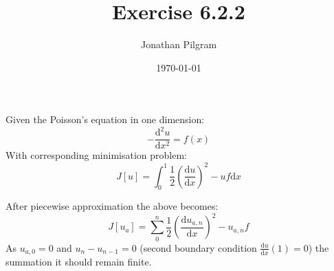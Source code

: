 \documentclass{article}
\title{Exercise 6.2.2}
\author{Jonathan Pilgram}
\date{\today}
\begin{document}
\maketitle

Given the Poisson's equation in one dimension: 
\[
	-\frac{\mathrm{d}^2u}{\mathrm{d}x^2} = f(x)
\] 
With corresponding minimisation problem: 
\[
	J[u] = \int_{0}^{1} \frac{1}{2} ( \frac{\mathrm{d}u}{\mathrm{d}x} )^2-uf \mathrm{d}x
\] 

After piecewise approximation the above becomes: 
\[
	J[u_a] = \sum_{0}^{n} \frac{1}{2} ( \frac{\mathrm{d}u_{a,n}}{\mathrm{d}x} )^2-u_{a,n}f 
\] 
As $u_{a,0} = 0$ and  $u_n-u_{n-1} = 0$  (second boundary condition $\frac{\mathrm{d}u}{\mathrm{d}x} (1) =0$) the summation it should remain finite. 
 
\end{document}
